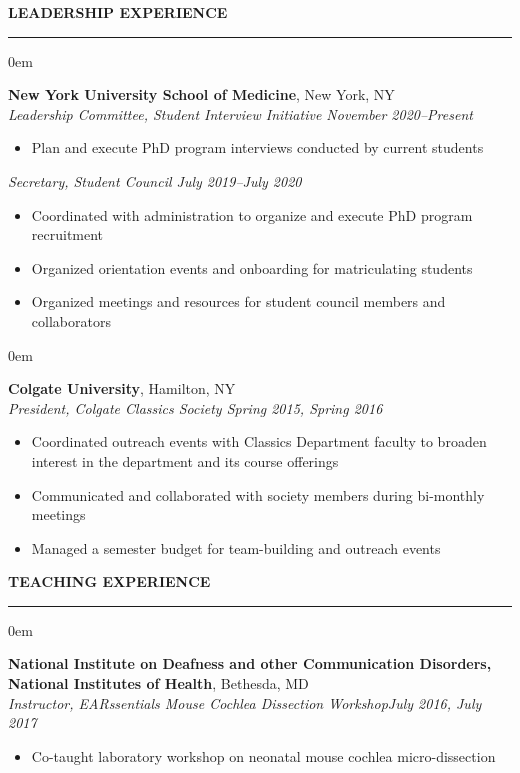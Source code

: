 \documentclass[11pt, letterpaper]{article}
\newenvironment{CVSection}{
\begin{addmargin}[2em]{0em}
\begin{samepage}}
{\end{samepage}
\end{addmargin}\bigskip}
\newcommand{\CVHeading}[1]{
\MakeUppercase{\bf #1}
\smallskip
\hrule
\medskip
}
\begin{document}
\CVHeading{Leadership Experience}
\begin{CVSection}
\textbf{New York University School of Medicine}, New York, NY\\
\textsl{Leadership Committee, Student Interview Initiative	\hfill November 2020--Present}
\begin{itemize}
\item Plan and execute PhD program interviews conducted by current students
\end{itemize}
\medskip
\textsl{Secretary, Student Council	\hfill July 2019--July 2020}
\begin{itemize}
\item Coordinated with administration to organize and execute PhD program recruitment
\item Organized orientation events and onboarding for matriculating students
\item Organized meetings and resources for student council members and collaborators
\end{itemize}
\end{CVSection}
\begin{CVSection}
\textbf{Colgate University}, Hamilton, NY\\
\textsl{President, Colgate Classics Society	\hfill Spring 2015, Spring 2016}
\begin{itemize}
\item Coordinated outreach events with Classics Department faculty to broaden interest in the department and its course offerings
\item Communicated and collaborated with society members during bi-monthly meetings
\item Managed a semester budget for team-building and outreach events
\end{itemize}
\end{CVSection}

\CVHeading{Teaching Experience}
\begin{CVSection}
\textbf{National Institute on Deafness and other Communication Disorders,\\ National Institutes of Health}, Bethesda, MD\\
\textsl{Instructor, EARssentials Mouse Cochlea Dissection Workshop\hfill July 2016, July 2017}
\begin{itemize}
\item Co-taught laboratory workshop on neonatal mouse cochlea micro-dissection
\end{itemize}
\end{CVSection}
\end{document}
